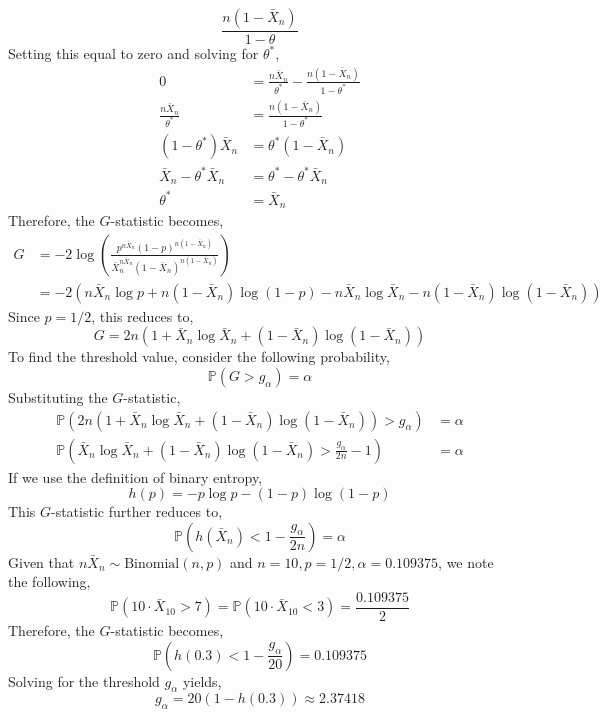 \documentclass[12pt,twoside]{article}
\begin{document}
\begin{problems}
\begin{problemparts}
$$\frac{n(1 - \bar{X}_n)}{1 - \theta} $$
Setting this equal to zero and solving for $\theta^*$,
\begin{align*}
    0 &= \frac{n \bar{X}_n}{\theta^*} - \frac{n(1 - \bar{X}_n)}{1 - \theta^*} \\
    \frac{n \bar{X}_n}{\theta^*} &= \frac{n(1 - \bar{X}_n)}{1 - \theta^*} \\
    (1 - \theta^*) \bar{X}_n &= \theta^* (1 - \bar{X}_n) \\
    \bar{X}_n - \theta^* \bar{X}_n &= \theta^* - \theta^* \bar{X}_n \\
    \theta^* &= \bar{X}_n
\end{align*}
Therefore, the $G$-statistic becomes,
\begin{align*}
    G &= -2 \log \left(\frac{p^{n \bar{X}_n} (1 - p)^{n(1 -
    \bar{X}_n)}}{\bar{X}_n^{n \bar{X}_n} (1 - \bar{X}_n)^{n(1 -
    \bar{X}_n)}}\right) \\
    &= -2 \left(n \bar{X}_n \log p + n(1 - \bar{X}_n) \log (1 - p) -
    n\bar{X}_n \log \bar{X}_n - n(1 - \bar{X}_n)\log(1 - \bar{X}_n)\right)
\end{align*}
Since $p = 1/2$, this reduces to,
$$ \boxed{G = 2n \left(1 + \bar{X}_n \log \bar{X}_n + (1 - \bar{X}_n)\log(1 -
\bar{X}_n)\right)} $$
To find the threshold value, consider the following probability,
$$ \mathbb{P}\left(G > g_\alpha\right) = \alpha $$
Substituting the $G$-statistic,
\begin{align*}
    \mathbb{P}\left(2 n \left(1 + \bar{X}_n \log \bar{X}_n + (1 -
    \bar{X}_n)\log(1 - \bar{X}_n)\right) > g_\alpha\right) &= \alpha \\
    \mathbb{P}\left(\bar{X}_n \log \bar{X}_n + (1 - \bar{X}_n)\log(1 -
    \bar{X}_n) > \frac{g_\alpha}{2n} - 1\right) &= \alpha
\end{align*}
If we use the definition of binary entropy,
$$ h(p) = - p \log p - (1 - p) \log (1 - p) $$
This $G$-statistic further reduces to,
$$ \mathbb{P}\left(h(\bar{X}_n) < 1 - \frac{g_\alpha}{2n}\right) = \alpha $$
Given that $n \bar{X}_n \sim \mathrm{Binomial}(n, p)$ and $n = 10, p = 1/2,
\alpha = 0.109375$, we note the following,
$$ \mathbb{P}(10 \cdot \bar{X}_{10} > 7) = \mathbb{P}(10 \cdot \bar{X}_{10} <
3) = \frac{0.109375}{2} $$
Therefore, the $G$-statistic becomes,
$$ \mathbb{P}\left(h(0.3) < 1 - \frac{g_\alpha}{20}\right) = 0.109375 $$
Solving for the threshold $g_\alpha$ yields,
$$ g_\alpha = 20(1 - h(0.3)) \approx \boxed{2.37418} $$

\problempart  %


\end{problemparts}
\end{problems}
\end{document}
